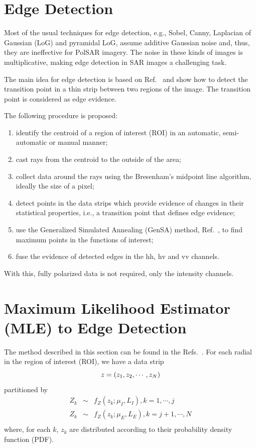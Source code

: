 \documentclass[conference]{IEEEtran}
\begin{document}
\section{Edge Detection}\label{sec_04}

Most of the usual techniques for edge detection, e.g., 
Sobel, Canny, Laplacian of Gaussian (LoG) and pyramidal LoG, assume additive Gaussian noise and, thus, they are ineffective for PolSAR imagery.
The noise in these kinds of images is multiplicative, making edge detection in SAR images a challenging task.

The main idea for edge detection is based on Ref.~\cite{nhfc, gmbf} and show how to detect the transition point in a thin strip between two regions of the image. The transition point is considered as edge evidence. 

The following procedure is proposed:
\begin{enumerate}
	\item identify the centroid of a region of interest (ROI) in an automatic, semi-automatic or manual manner;
	\item cast rays from the centroid to the outside of the area;
	\item collect data around the rays using the  Bresenham's midpoint line algorithm, ideally the size of a pixel;
	\item detect points in the data strips which provide evidence of changes in their statistical properties, i.e., a transition point that defines edge evidence;
	\item use the Generalized Simulated Annealing (GenSA) method, Ref.~\cite{xgsh}, to find maximum points in the functions of interest;
	\item fuse the evidence of detected edges in the $\text{hh}$, $\text{hv}$ and $\text{vv}$ channels.
\end{enumerate}
With this, fully polarized data is not required, only the intensity channels.

\section{Maximum Likelihood Estimator (MLE) to Edge Detection}\label{sec_05}

The method described in this section can be found in the Refs.~\cite{gmbf,nhfc}. For each radial in the region of interest (ROI), we have a data strip
\begin{equation}\nonumber
	z = (z_1,z_2,\cdots,z_N) \\
\end{equation}
partitioned by
\begin{equation}\label{func_max_ver_uni_gamma} 
\begin{array}{lll}
	Z_k&\sim&f_Z(z_k;\mu_I,L_I), k=1,\cdots,j\\
	Z_k&\sim&f_Z(z_k;\mu_E,L_E), k=j+1,\cdots,N\\
\end{array}
\end{equation}
where, for each $k$, $z_k$ are distributed according to their probability density function (PDF).
\end{document}
